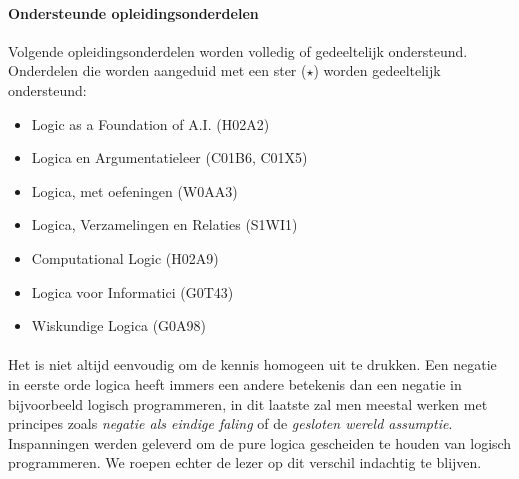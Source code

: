 \documentclass[titlepage,a4paper]{book}
\theoremstyle{definition}
\theoremstyle{remark}
\begin{document}
\paragraph{Ondersteunde opleidingsonderdelen} Volgende opleidingsonderdelen worden volledig of gedeeltelijk ondersteund. Onderdelen die worden aangeduid met een ster ($\star$) worden gedeeltelijk ondersteund:
\begin{multicols}{2}
\begin{itemize}
 \item Logic as a Foundation of A.I. (H02A2)
 \item Logica en Argumentatieleer (C01B6, C01X5)
 \item Logica, met oefeningen (W0AA3)
 \item Logica, Verzamelingen en Relaties (S1WI1)
 \item Computational Logic (H02A9)
 \item Logica voor Informatici (G0T43)
 \item Wiskundige Logica (G0A98)
\end{itemize}
\end{multicols}
\paragraph{}
Het is niet altijd eenvoudig om de kennis homogeen uit te drukken. Een negatie in eerste orde logica heeft immers een andere betekenis dan een negatie in bijvoorbeeld logisch programmeren, in dit laatste zal men meestal werken met principes zoals \emph{negatie als eindige faling} of de \emph{gesloten wereld assumptie}. Inspanningen werden geleverd om de pure logica gescheiden te houden van logisch programmeren. We roepen echter de lezer op dit verschil indachtig te blijven.
\mainmatter




\backmatter

\nocite{*}

\printindex
\end{document}
